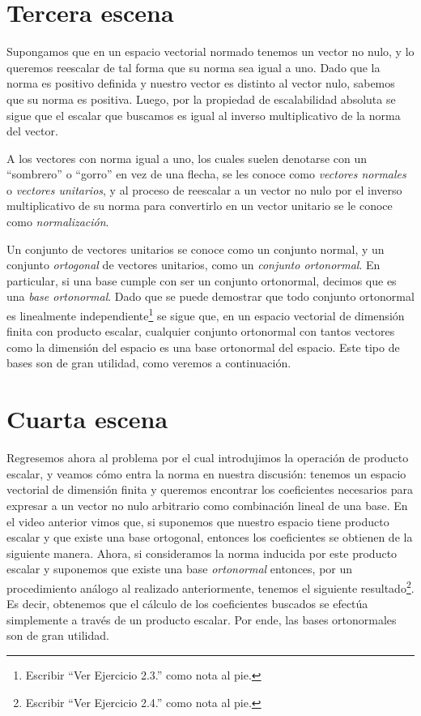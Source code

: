\documentclass[12pt,dvipsnames]{article}
\numberwithin{equation}{section}
\begin{document}

\newpage
\section{Tercera escena}

Supongamos que en un espacio vectorial normado tenemos un vector no nulo, y lo queremos reescalar de tal forma que su norma sea igual a uno. Dado que la norma es positivo definida y nuestro vector es distinto al vector nulo, sabemos que su norma es positiva. Luego, por la propiedad de escalabilidad absoluta se sigue que el escalar que buscamos es igual al inverso multiplicativo de la norma del vector.

A los vectores con norma igual a uno, los cuales suelen denotarse con un ``sombrero'' o ``gorro'' en vez de una flecha, se les conoce como \emph{vectores normales} o \emph{vectores unitarios}, y al proceso de reescalar a un vector no nulo por el inverso multiplicativo de su norma para convertirlo en un vector unitario se le conoce como \emph{normalización}.

Un conjunto de vectores unitarios se conoce como un conjunto normal, y un conjunto \emph{ortogonal} de vectores unitarios, como un \emph{conjunto ortonormal}. En particular, si una base cumple con ser un conjunto ortonormal, decimos que es una \emph{base ortonormal}. Dado que se puede demostrar que todo conjunto ortonormal es linealmente independiente\footnote{Escribir ``Ver Ejercicio 2.3.'' como nota al pie.} se sigue que, en un espacio vectorial de dimensión finita con producto escalar, cualquier conjunto ortonormal con tantos vectores como la dimensión del espacio es una base ortonormal del espacio. Este tipo de bases son de gran utilidad, como veremos a continuación.


\newpage
\section{Cuarta escena}

Regresemos ahora al problema por el cual introdujimos la operación de producto escalar, y veamos cómo entra la norma en nuestra discusión: tenemos un espacio vectorial de dimensión finita y queremos encontrar los coeficientes necesarios para expresar a un vector no nulo arbitrario como combinación lineal de una base. En el video anterior vimos que, si suponemos que nuestro espacio tiene producto escalar y que existe una base ortogonal, entonces los coeficientes se obtienen de la siguiente manera. Ahora, si consideramos la norma inducida por este producto escalar y suponemos que existe una base \emph{ortonormal} entonces, por un procedimiento análogo al realizado anteriormente, tenemos el siguiente resultado\footnote{Escribir ``Ver Ejercicio 2.4.'' como nota al pie.}. Es decir, obtenemos que el cálculo de los coeficientes buscados se efectúa simplemente a través de un producto escalar. Por ende, las bases ortonormales son de gran utilidad.
\end{document}
